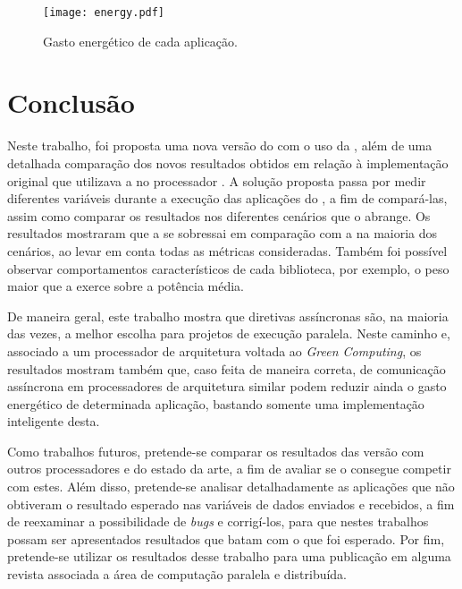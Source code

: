 \clearpage

\begin{figure}[h]
  \centering
  \caption{Gasto energético de cada aplicação.}
  \label{fig:energy}
  \texttt{[image: energy.pdf]}
\end{figure}

\chapter{Conclusão}
\label{ch:conclusao}

Neste trabalho, foi proposta uma nova versão do \capb com o uso da \API \ASYNC, além de uma detalhada comparação dos novos resultados obtidos em relação à implementação original que utilizava a \API \IPC no processador \mppa. A solução proposta passa por medir diferentes variáveis durante a execução das aplicações do \capb, a fim de compará-las, assim como comparar os resultados nos diferentes cenários que o \capb abrange.  Os resultados mostraram que a \API \ASYNC se sobressai em comparação com a \IPC na maioria dos cenários, ao levar em conta todas as métricas consideradas. Também foi possível observar comportamentos característicos de cada biblioteca, por exemplo, o peso maior que a \ASYNC exerce sobre a potência média.

De maneira geral, este trabalho mostra que diretivas assíncronas são, na maioria das vezes, a melhor escolha para projetos de execução paralela. Neste caminho e, associado a um processador de arquitetura voltada ao \textit{Green Computing}, os resultados mostram também que, caso feita de maneira correta, \APIs de comunicação assíncrona em processadores de arquitetura similar podem reduzir ainda o gasto energético de determinada aplicação, bastando somente uma implementação inteligente desta.

Como trabalhos futuros, pretende-se comparar os resultados das versão \ASYNC com outros processadores \manycore e \multicore do estado da arte, a fim de avaliar se o \mppa consegue competir com estes. Além disso, pretende-se analisar detalhadamente as aplicações \capb que não obtiveram o resultado esperado nas variáveis de dados enviados e recebidos, a fim de reexaminar a possibilidade de \textit{bugs} e corrigí-los, para que nestes trabalhos possam ser apresentados resultados que batam com o que foi esperado. Por fim, pretende-se utilizar os resultados desse trabalho para uma publicação em alguma revista associada a área de computação paralela e distribuída.

